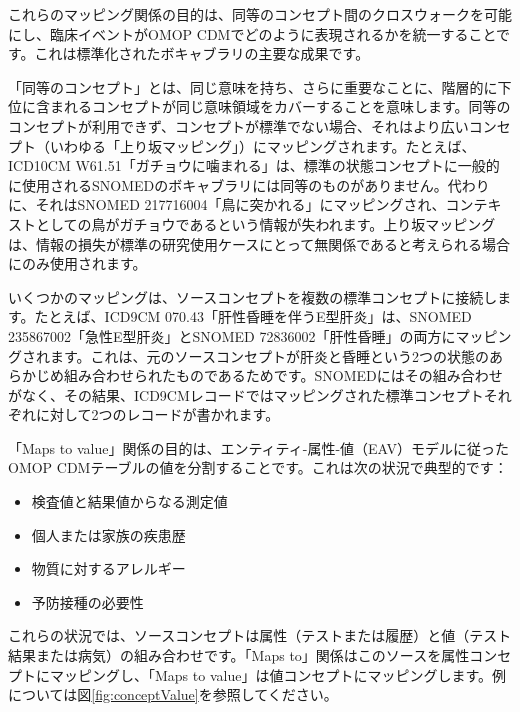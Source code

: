 \documentclass[
  11pt]{book}
\providecommand{\tightlist}{%
  \setlength{\itemsep}{0pt}\setlength{\parskip}{0pt}}
\theoremstyle{definition}
\theoremstyle{definition}
\theoremstyle{definition}
\theoremstyle{definition}
\theoremstyle{remark}
\begin{document}
これらのマッピング関係の目的は、同等のコンセプト間のクロスウォークを可能にし、臨床イベントがOMOP CDMでどのように表現されるかを統一することです。これは標準化されたボキャブラリの主要な成果です。

「同等のコンセプト」とは、同じ意味を持ち、さらに重要なことに、階層的に下位に含まれるコンセプトが同じ意味領域をカバーすることを意味します。同等のコンセプトが利用できず、コンセプトが標準でない場合、それはより広いコンセプト（いわゆる「上り坂マッピング」）にマッピングされます。たとえば、ICD10CM W61.51「ガチョウに噛まれる」は、標準の状態コンセプトに一般的に使用されるSNOMEDのボキャブラリには同等のものがありません。代わりに、それはSNOMED 217716004「鳥に突かれる」にマッピングされ、コンテキストとしての鳥がガチョウであるという情報が失われます。上り坂マッピングは、情報の損失が標準の研究使用ケースにとって無関係であると考えられる場合にのみ使用されます。

いくつかのマッピングは、ソースコンセプトを複数の標準コンセプトに接続します。たとえば、ICD9CM 070.43「肝性昏睡を伴うE型肝炎」は、SNOMED 235867002「急性E型肝炎」とSNOMED 72836002「肝性昏睡」の両方にマッピングされます。これは、元のソースコンセプトが肝炎と昏睡という2つの状態のあらかじめ組み合わせられたものであるためです。SNOMEDにはその組み合わせがなく、その結果、ICD9CMレコードではマッピングされた標準コンセプトそれぞれに対して2つのレコードが書かれます。

「Maps to value」関係の目的は、エンティティ-属性-値（EAV）モデルに従ったOMOP CDMテーブルの値を分割することです。これは次の状況で典型的です：

\begin{itemize}
\tightlist
\item
  検査値と結果値からなる測定値
\item
  個人または家族の疾患歴
\item
  物質に対するアレルギー
\item
  予防接種の必要性
\end{itemize}

これらの状況では、ソースコンセプトは属性（テストまたは履歴）と値（テスト結果または病気）の組み合わせです。「Maps to」関係はこのソースを属性コンセプトにマッピングし、「Maps to value」は値コンセプトにマッピングします。例については図\ref{fig:conceptValue}を参照してください。
\end{document}
